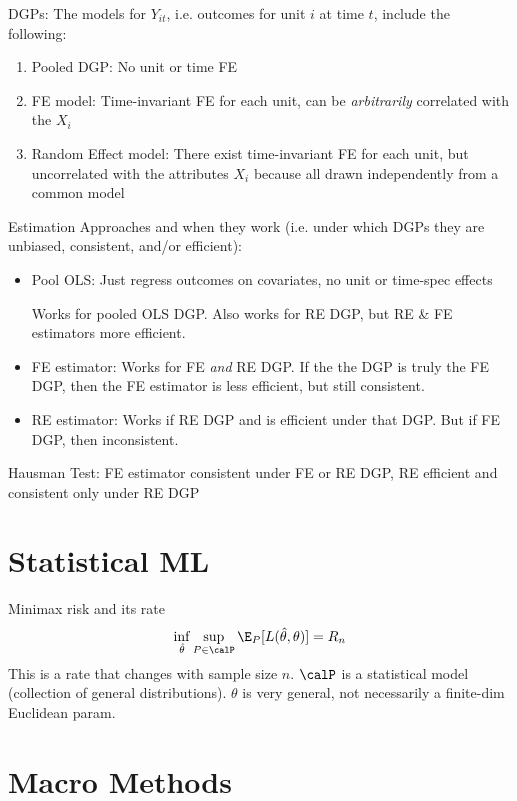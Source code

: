 \documentclass[12pt]{article}
\theoremstyle{plain}
\theoremstyle{definition}
\theoremstyle{remark}
\begin{document}
DGPs:
The models for $Y_{it}$, i.e. outcomes for unit $i$ at time $t$, include
the following:
\begin{enumerate}
  \item Pooled DGP:
    No unit or time FE
  \item FE model:
    Time-invariant FE for each unit, can be
    \emph{arbitrarily} correlated with the $X_i$
  \item Random Effect model:
    There exist time-invariant FE for each unit, but uncorrelated with
    the attributes $X_i$ because all drawn independently from a common
    model
\end{enumerate}
Estimation Approaches and when they work (i.e. under which DGPs they are
unbiased, consistent, and/or efficient):
\begin{itemize}
  \item Pool OLS: Just regress outcomes on covariates, no unit or
    time-spec effects

    Works for pooled OLS DGP.
    Also works for RE DGP, but RE \& FE estimators more efficient.

  \item FE estimator:
    Works for FE \emph{and} RE DGP.
    If the the DGP is truly the FE DGP, then the FE estimator is less
    efficient, but still consistent.

  \item RE estimator:
    Works if RE DGP and is efficient under that DGP.
    But if FE DGP, then inconsistent.
\end{itemize}
Hausman Test:
FE estimator consistent under FE or RE DGP, RE efficient and
consistent only under RE DGP



\clearpage
\section{Statistical ML}

Minimax risk and its rate
\begin{align*}
  \inf_{\hat{\theta}}
  \sup_{P\in \calP}
  \E_P[L(\hat{\theta},\theta)]=R_n
\end{align*}
This is a rate that changes with sample size $n$.
$\calP$ is a statistical model (collection of general distributions).
$\theta$ is very general, not necessarily a finite-dim Euclidean param.





\clearpage
\section{Macro Methods}
\end{document}
